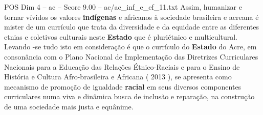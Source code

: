 \begin{textsample}{POS Dim 4 – ac – Score 9.00 – ac/ac\_inf\_e\_ef\_11.txt}
Assim, humanizar e tornar vívidos os valores \textbf{indígenas} e africanos à sociedade brasileira e acreana é mister de um currículo que trata da diversidade e da equidade entre as diferentes etnias e coletivos culturais neste \textbf{Estado} que é pluriétnico e multicultural.
Levando -se tudo isto em consideração é que o currículo do \textbf{Estado} do Acre, em consonância com o Plano Nacional de Implementação das Diretrizes Curriculares Nacionais para a Educação das Relações Étnico-Raciais e para o Ensino de História e Cultura Afro-brasileira e Africana ( 2013 ), se apresenta como mecanismo de promoção de igualdade \textbf{racial} em seus diversos componentes curriculares numa viva e dinâmica busca de inclusão e reparação, na construção de uma sociedade mais justa e equânime.

\end{textsample}
